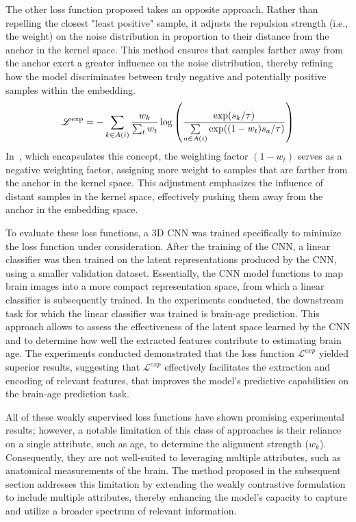 The other loss function proposed takes an opposite approach. Rather than
repelling the closest "least positive" sample, it adjusts the repulsion strength
(i.e., the weight) on the noise distribution in proportion to their distance
from the anchor in the kernel space. This method ensures that samples farther
away from the anchor exert a greater influence on the noise distribution,
thereby refining how the model discriminates between truly negative and
potentially positive samples within the embedding.
\begin{equation}
    \labeq{4_6}
    \mathscr{L}^{\text{exp}} = 
    -\sum_{k \in A(i)} \frac{w_k}{\sum_t w_t} \log
    \left(
    \frac
    {\exp(s_k / \tau)}
    {\sum\limits_{a \in A(i)} \exp((1 - w_t) s_a / \tau)}
    \right)
\end{equation}
In~, which encapsulates this concept, the weighting factor $(1 -
w_t)$ serves as a negative weighting factor, assigning more weight to samples
that are farther from the anchor in the kernel space. This adjustment emphasizes
the influence of distant samples in the kernel space, effectively pushing them
away from the anchor in the embedding space.

To evaluate these loss functions, a 3D CNN was trained specifically to minimize
the loss function under consideration. After the training of the CNN, a linear
classifier was then trained on the latent representations produced by the CNN,
using a smaller validation dataset. Essentially, the CNN model functions to map
brain images into a more compact representation space, from which a linear
classifier is subsequently trained. In the experiments conducted, the downstream
task for which the linear classifier was trained is brain-age prediction. This
approach allows to assess the effectiveness of the latent space learned by the
CNN and to determine how well the extracted features contribute to estimating
brain age. The experiments conducted demonstrated that the loss function
$\mathcal{L}^{exp}$ yielded superior results, suggesting that
$\mathcal{L}^{exp}$ effectively facilitates the extraction and encoding of
relevant features, that improves the model's predictive capabilities on the
brain-age prediction task.

All of these weakly supervised loss functions have shown promising experimental
results; however, a notable limitation of this class of approaches is their
reliance on a single attribute, such as age, to determine the alignment strength
($w_k$). Consequently, they are not well-suited to leveraging multiple
attributes, such as anatomical measurements of the brain. The method proposed in
the subsequent section addresses this limitation by extending the weakly
contrastive formulation to include multiple attributes, thereby enhancing the
model’s capacity to capture and utilize a broader spectrum of relevant
information.

